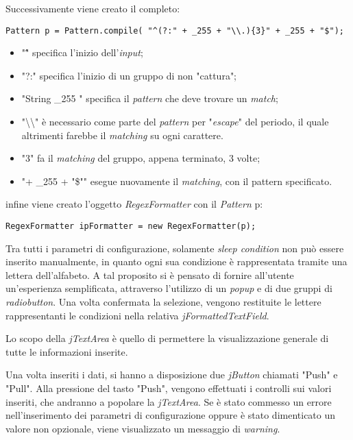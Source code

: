 Successivamente viene creato il  completo:

\vspace{0.5cm}
\begin{lstlisting}
Pattern p = Pattern.compile( "^(?:" + _255 + "\\.){3}" + _255 + "$");
\end{lstlisting}

\begin{itemize}
	\item "\^"  specifica l'inizio dell'\textit{input};
	\item "?:" specifica l'inizio di un gruppo di non "cattura";
	\item "String \_255 " specifica il \textit{pattern} che deve trovare un \textit{match};
	\item "\textbackslash\textbackslash "  \`{e} necessario come parte del \textit{pattern} per "\textit{escape}" del periodo, il quale altrimenti farebbe il \textit{matching} su ogni carattere.
	\item "{3}" fa il \textit{matching} del gruppo, appena terminato, 3 volte; 
	\item "{{+ \_255 + "\$"}}" esegue nuovamente il \textit{matching}, con il pattern specificato.
\end{itemize}

infine viene creato l'oggetto \textit{RegexFormatter} con il \textit{Pattern} p:

\vspace{0.5cm}
\begin{lstlisting}
RegexFormatter ipFormatter = new RegexFormatter(p);
\end{lstlisting}

Tra tutti i parametri di configurazione, solamente \textit{sleep condition} non pu\`{o} essere inserito manualmente, in quanto ogni sua condizione \`{e} rappresentata tramite una lettera dell'alfabeto. A tal proposito si \`{e} pensato di fornire all'utente un'esperienza semplificata, attraverso l'utilizzo di un \textit{popup} e di due gruppi di \textit{radiobutton}. 
Una volta confermata la selezione, vengono restituite le lettere rappresentanti le condizioni nella relativa \textit{jFormattedTextField}.

Lo scopo della \textit{jTextArea} \`{e} quello di permettere la visualizzazione generale di tutte le informazioni inserite.

Una volta inseriti i dati, si hanno a disposizione due \textit{jButton} chiamati "Push" e "Pull". 
Alla pressione del tasto "Push", vengono effettuati i controlli sui valori inseriti, che andranno a popolare la \textit{jTextArea}. Se \`{e} stato commesso un errore nell'inserimento dei parametri di configurazione oppure \`{e} stato dimenticato un valore non opzionale, viene visualizzato un messaggio di \textit{warning}.

